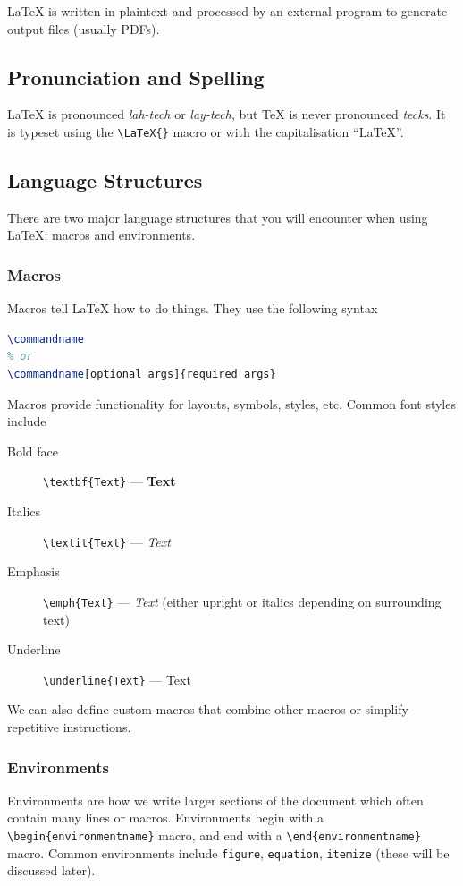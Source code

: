 \documentclass[11pt, twoside]{article}
\begin{document}
\LaTeX{} is written in plaintext and processed by an external program to generate output files (usually PDFs).

\subsection{Pronunciation and Spelling}
\LaTeX{} is pronounced \emph{lah-tech} or \emph{lay-tech}, but \TeX{} is never pronounced \emph{tecks}. It is typeset using the \lstinline|\LaTeX{}| macro or with the capitalisation ``LaTeX''.

\subsection{Language Structures}
There are two major language structures that you will encounter when using \LaTeX{}; macros and environments.

\subsubsection{Macros}
Macros tell \LaTeX{} how to do things. They use the following syntax
\begin{lstlisting}[language=tex]
\commandname
% or
\commandname[optional args]{required args}
\end{lstlisting}
Macros provide functionality for layouts, symbols, styles, etc. Common font styles include
\begin{description}
    \item[Bold face] \lstinline!\textbf{Text}! --- \textbf{Text} 
    \item[Italics] \lstinline!\textit{Text}! --- \textit{Text}
    \item[Emphasis] \lstinline!\emph{Text}! --- \emph{Text} (either upright or italics depending on surrounding text)
    \item[Underline] \lstinline!\underline{Text}! --- \underline{Text}
\end{description}
We can also define custom macros that combine other macros or simplify repetitive instructions.
\subsubsection{Environments}
Environments are how we write larger sections of the document which often contain many lines or macros. Environments begin with a \lstinline|\begin{environmentname}| macro, and end with a \lstinline|\end{environmentname}| macro. Common environments include \lstinline{figure}, \lstinline{equation}, \lstinline{itemize} (these will be discussed later).
\end{document}
